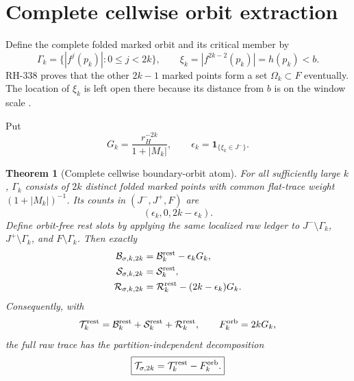 \documentclass[11pt]{article}
\newtheorem{theorem}{Theorem}[section]
\theoremstyle{remark}
\newcommand{\cB}{\mathcal B}
\newcommand{\cS}{\mathcal S}
\newcommand{\cR}{\mathcal R}
\newcommand{\cT}{\mathcal T}
\newcommand{\one}{\mathbf 1}
\begin{document}
\section{Complete cellwise orbit extraction}

Define the complete folded marked orbit and its critical member by
\begin{equation}\label{eq:Gamma}
 \Gamma_k=\{|f^j(p_k)|:0\le j<2k\},\qquad
 \xi_k=|f^{2k-2}(p_k)|=h(p_k)<b.
\end{equation}
RH-338 proves that the other $2k-1$ marked points form a set
$\Omega_k\subset F$ eventually.  The location of $\xi_k$ is left open there
because its distance from $b$ is on the window scale
\citep{WangFarAtom2026}.

Put
\begin{equation}\label{eq:G}
 G_k=\frac{r_H^{-2k}}{1+|M_k|},\qquad
 \epsilon_k=\one_{\{\xi_k\in J^-\}}.
\end{equation}

\begin{theorem}[Complete cellwise boundary-orbit atom]
\label{thm:cellwise}
For all sufficiently large $k$, $\Gamma_k$ consists of $2k$ distinct folded
marked points with common flat-trace weight $(1+|M_k|)^{-1}$.  Its counts in
$(J^-,J^+,F)$ are
\begin{equation}\label{eq:counts}
 (\epsilon_k,0,2k-\epsilon_k).
\end{equation}
Define orbit-free rest slots by applying the same localized raw ledger to
$J^-\setminus\Gamma_k$, $J^+\setminus\Gamma_k$, and
$F\setminus\Gamma_k$.  Then exactly
\begin{align}
 \cB_{\sigma,k,2k}&=\cB_k^{\rm rest}-\epsilon_kG_k,
 \label{eq:Brest}\\
 \cS_{\sigma,k,2k}&=\cS_k^{\rm rest},
 \label{eq:Srest}\\
 \cR_{\sigma,k,2k}&=\cR_k^{\rm rest}-(2k-\epsilon_k)G_k.
 \label{eq:Rrest}
\end{align}
Consequently, with
\begin{equation}\label{eq:Trest}
 \cT_k^{\rm rest}=\cB_k^{\rm rest}+\cS_k^{\rm rest}
 +\cR_k^{\rm rest},\qquad F_k^{\rm orb}=2kG_k,
\end{equation}
the full raw trace has the partition-independent decomposition
\begin{equation}\label{eq:raw-complete}
 \boxed{\cT_{\sigma,2k}=\cT_k^{\rm rest}-F_k^{\rm orb}.}
\end{equation}
\end{theorem}
\end{document}

